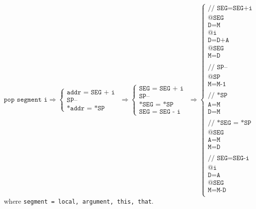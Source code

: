 \documentclass[a4paper]{book}
\begin{document}
\[
    \texttt{pop segment i}
    \Rightarrow
    \begin{cases}
        \texttt{addr = SEG + i } \\
        \texttt{SP--           } \\
        \texttt{*addr = *SP    }
    \end{cases}
    \Rightarrow
    \begin{cases}
        \texttt{SEG = SEG + i } \\
        \texttt{SP--          } \\
        \texttt{*SEG = *SP    } \\
        \texttt{SEG = SEG - i }
    \end{cases}
    \Rightarrow
    \begin{cases}
        \texttt{// SEG=SEG+i  } \\
        \texttt{@SEG          } \\
        \texttt{D=M           } \\
        \texttt{@i            } \\
        \texttt{D=D+A         } \\
        \texttt{@SEG          } \\
        \texttt{M=D           } \\
        \\
        \texttt{// SP--       } \\
        \texttt{@SP           } \\
        \texttt{M=M-1         } \\
        \\
        \texttt{// *SP        } \\
        \texttt{A=M           } \\
        \texttt{D=M           } \\
        \\
        \texttt{// *SEG = *SP } \\
        \texttt{@SEG          } \\
        \texttt{A=M           } \\
        \texttt{M=D           } \\
        \\
        \texttt{// SEG=SEG-i  } \\
        \texttt{@i            } \\
        \texttt{D=A           } \\
        \texttt{@SEG          } \\
        \texttt{M=M-D         } \\
    \end{cases}
\]
where \texttt{segment = local, argument, this, that}.
\end{document}
